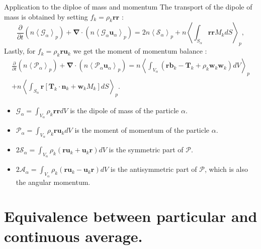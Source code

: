 \documentclass{sintefbeamer}
\newcommand{\pavg}[1]{n \left<#1\right>_p}
\newcommand{\nablab}{\bm{\nabla}}
\newcommand{\pddt}{\frac{\partial}{\partial t}}
\begin{document}
\begin{frame}
  {Application to the diploe of mass and momentum}
  The transport of the dipole of mass is obtained by setting $f_k = \rho_k \textbf{rr}$ :
  \begin{equation*}
    \pddt   \left(\pavg{\mathcal{G}_\alpha}\right)
    + \nablab \cdot \left(\pavg{\mathcal{G}_\alpha \textbf{u}_\alpha}\right) 
    = 2 \pavg{\mathcal{S}_\alpha}
    + \pavg{\int_{S_\alpha} \textbf{rr} M_k dS},
\end{equation*}
  Lastly, for $f_k = \rho_k \textbf{r} \textbf{u}_k$ we get the moment of momentum balance :
  \begin{multline}
    \pddt   \left(\pavg{\mathcal{P}_\alpha}\right)
    + \nablab \cdot \left(\pavg{\mathcal{P}_\alpha \textbf{u}_\alpha}\right) 
    = \pavg{\int_{V_\alpha} \left( 
        \textbf{r} \textbf{b}_k 
        - \textbf{T}_k
        + \rho_k \textbf{w}_k  \textbf{w}_k 
    \right) dV}\\
    + \pavg{
    \int_{S_\alpha} \textbf{r} \left[
        \textbf{T}_k \cdot \textbf{n}_k
        + \textbf{w}_k M_k
    \right] dS}.
\end{multline}
\begin{itemize}
  \item $\mathcal{G}_\alpha = \int_{V_\alpha} \rho_k\textbf{rr} dV$ is the dipole of mass of the particle $\alpha$.
  \item $\mathcal{P}_\alpha = \int_{V_\alpha} \rho_k \textbf{r}\textbf{u}_k dV$ is the moment of momentum of the particle $\alpha$.
  \item $2\mathcal{S}_\alpha = \int_{V_\alpha} \rho_k (\textbf{r}\textbf{u}_k+\textbf{u}_k\textbf{r}) dV$ is the symmetric part of $\mathcal{P}$. 
  \item $2\mathcal{A}_\alpha = \int_{V_\alpha} \rho_k (\textbf{r}\textbf{u}_k-\textbf{u}_k\textbf{r}) dV$ is the antisymmetric part of $\mathcal{P}$, which is also the angular momentum. 
\end{itemize}
\end{frame}

\section{Equivalence between particular and continuous average.}
\end{document}
